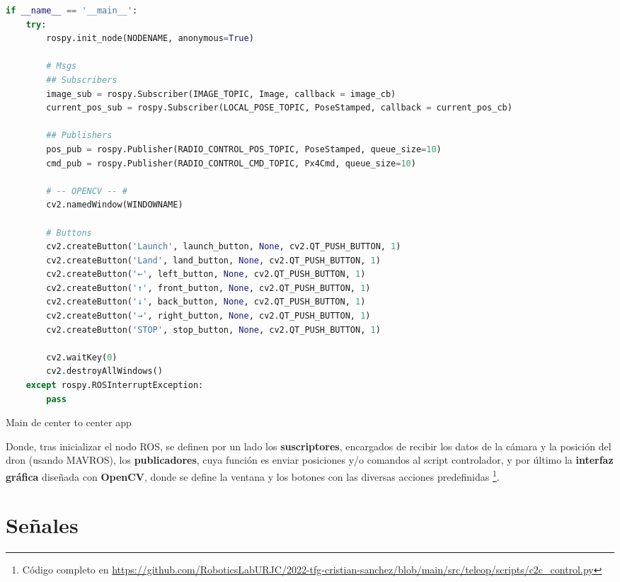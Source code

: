 \begin{code}[H]
\begin{lstlisting}[language=Python]
if __name__ == '__main__':
    try:
        rospy.init_node(NODENAME, anonymous=True)

        # Msgs
        ## Subscribers
        image_sub = rospy.Subscriber(IMAGE_TOPIC, Image, callback = image_cb)
        current_pos_sub = rospy.Subscriber(LOCAL_POSE_TOPIC, PoseStamped, callback = current_pos_cb)

        ## Publishers
        pos_pub = rospy.Publisher(RADIO_CONTROL_POS_TOPIC, PoseStamped, queue_size=10)
        cmd_pub = rospy.Publisher(RADIO_CONTROL_CMD_TOPIC, Px4Cmd, queue_size=10)

        # -- OPENCV -- #
        cv2.namedWindow(WINDOWNAME)

        # Buttons
        cv2.createButton('Launch', launch_button, None, cv2.QT_PUSH_BUTTON, 1)
        cv2.createButton('Land', land_button, None, cv2.QT_PUSH_BUTTON, 1)
        cv2.createButton('←', left_button, None, cv2.QT_PUSH_BUTTON, 1)
        cv2.createButton('↑', front_button, None, cv2.QT_PUSH_BUTTON, 1)
        cv2.createButton('↓', back_button, None, cv2.QT_PUSH_BUTTON, 1)
        cv2.createButton('→', right_button, None, cv2.QT_PUSH_BUTTON, 1)
        cv2.createButton('STOP', stop_button, None, cv2.QT_PUSH_BUTTON, 1)

        cv2.waitKey(0)
        cv2.destroyAllWindows()
    except rospy.ROSInterruptException:
        pass
\end{lstlisting}
\caption[Main de center to center app]{Main de center to center app}
\label{cod:c2c_app}
\end{code}

Donde, tras inicializar el nodo \ac{ROS}, se definen por un lado los \textbf{suscriptores}, encargados de recibir los datos de la cámara y la posición del dron (usando MAVROS), los \textbf{publicadores}, cuya función es enviar posiciones y/o comandos al script controlador, y por último la \textbf{interfaz gráfica} diseñada con \textbf{OpenCV}, donde se define la ventana y los botones con las diversas acciones predefinidas \footnote{Código completo en \url{https://github.com/RoboticsLabURJC/2022-tfg-cristian-sanchez/blob/main/src/teleop/scripts/c2c_control.py}}.\\

\section{Señales}
\label{sec:signals}

